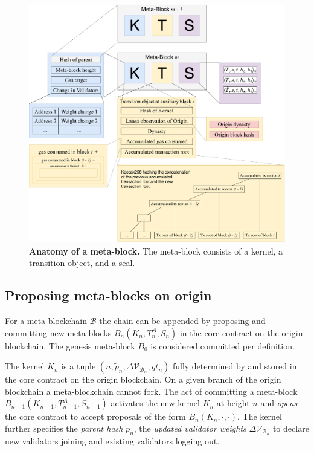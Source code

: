 \documentclass[12pt,a4paper]{article}
\begin{document}

\begin{figure}
    \centering
	\includegraphics[width=\textwidth]{meta_block}
	\caption{\textbf{Anatomy of a meta-block.}
		The meta-block consists of a kernel, a transition object, and a seal.
	}
	\label{fig:meta_block}
\end{figure}

\subsection{Proposing meta-blocks on origin}
\label{proposing_metablocks}

For a meta-blockchain $\mathcal{B}$ the chain can be appended by proposing and committing new meta-blocks $B_n(K_n, T^A_n, S_n)$ in the core contract on the origin block\-chain.
The genesis meta-block $B_0$ is considered committed per definition.

The kernel $K_n$ is a tuple $(n, \tilde{p}_n, \Delta\mathcal{V}_{\mathcal{B}_n}, gt_n)$ fully determined by and stored in the core contract on the origin blockchain. %
On a given branch of the origin blockchain a meta-blockchain cannot fork.
The act of committing a meta-block $B_{n-1}(K_{n-1}, T^A_{n-1}, S_{n-1})$ activates the new kernel $K_n$ at height $n$ and \emph{opens} the core contract to accept proposals of the form $B_n(K_n, \cdot, \cdot)$.
The kernel further specifies the \emph{parent hash} $\tilde{p}_n$, the \emph{updated validator weights} $\Delta\mathcal{V}_{\mathcal{B}_n}$ to declare new validators joining and existing validators logging out.
\end{document}
